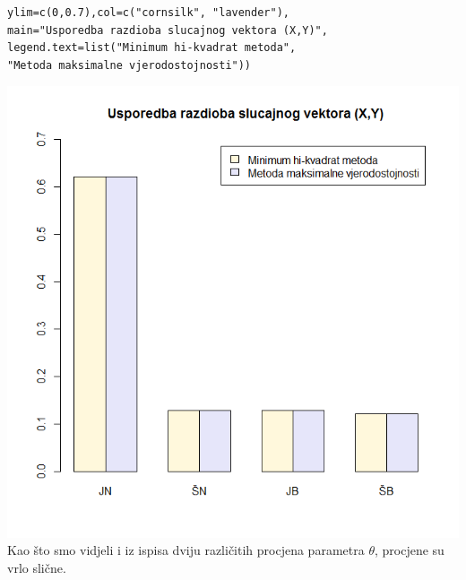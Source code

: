 \documentclass[11pt]{article}
\begin{document}
\begin{enumerate}[(a)]
\begin{verbatim}
ylim=c(0,0.7),col=c("cornsilk", "lavender"),
main="Usporedba razdioba slucajnog vektora (X,Y)",
legend.text=list("Minimum hi-kvadrat metoda",
"Metoda maksimalne vjerodostojnosti"))
\end{verbatim}
\includegraphics[scale=0.4]{6.png}\\
Kao što smo vidjeli i iz ispisa dviju različitih procjena parametra $\theta$, procjene su vrlo slične.
\end{enumerate}
\end{document}
